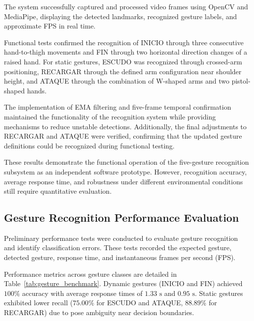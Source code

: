 \documentclass[lettersize,journal]{IEEEtran}
\begin{document}
	The system successfully captured and processed video frames using OpenCV and MediaPipe, displaying the detected landmarks, recognized gesture labels, and approximate FPS in real time.
	
	Functional tests confirmed the recognition of INICIO through three consecutive hand-to-thigh movements and FIN through two horizontal direction changes of a raised hand. For static gestures, ESCUDO was recognized through crossed-arm positioning, RECARGAR through the defined arm configuration near shoulder height, and ATAQUE through the combination of W-shaped arms and two pistol-shaped hands.
	
	The implementation of EMA filtering and five-frame temporal confirmation maintained the functionality of the recognition system while providing mechanisms to reduce unstable detections. Additionally, the final adjustments to RECARGAR and ATAQUE were verified, confirming that the updated gesture definitions could be recognized during functional testing.
	
	These results demonstrate the functional operation of the five-gesture recognition subsystem as an independent software prototype. However, recognition accuracy, average response time, and robustness under different environmental conditions still require quantitative evaluation.
	
	\subsection{Gesture Recognition Performance Evaluation}
	
	Preliminary performance tests were conducted to evaluate gesture recognition and identify classification errors. These tests recorded the expected gesture, detected gesture, response time, and instantaneous frames per second (FPS).
	
	Performance metrics across gesture classes are detailed in Table~\ref{tab:gesture_benchmark}. Dynamic gestures (INICIO and FIN) achieved $100\%$ accuracy with average response times of $1.33\text{ s}$ and $0.95\text{ s}$. Static gestures exhibited lower recall ($75.00\%$ for ESCUDO and ATAQUE, $88.89\%$ for RECARGAR) due to pose ambiguity near decision boundaries.
	
\end{document}
